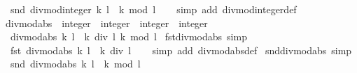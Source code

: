 \begin{isabellebody}
\ \ {\isachardoublequoteopen}snd\ {\isacharparenleft}{\kern0pt}divmod{\isacharunderscore}{\kern0pt}integer\ k\ l{\isacharparenright}{\kern0pt}\ {\isacharequal}{\kern0pt}\ k\ mod\ l{\isachardoublequoteclose}\isanewline
%
\isadelimproof
\ \ %
\endisadelimproof
%
\isatagproof
{}\isamarkupfalse%
\ {\isacharparenleft}{\kern0pt}simp\ add{\isacharcolon}{\kern0pt}\ divmod{\isacharunderscore}{\kern0pt}integer{\isacharunderscore}{\kern0pt}def{\isacharparenright}{\kern0pt}%
\endisatagproof
{\isafoldproof}%
%
\isadelimproof
\isanewline
%
\endisadelimproof
\isanewline
{}\isamarkupfalse%
\ divmod{\isacharunderscore}{\kern0pt}abs\ {\isacharcolon}{\kern0pt}{\isacharcolon}{\kern0pt}\ {\isachardoublequoteopen}integer\ {\isasymRightarrow}\ integer\ {\isasymRightarrow}\ integer\ {\isasymtimes}\ integer{\isachardoublequoteclose}\isanewline
{}\isanewline
\ \ {\isachardoublequoteopen}divmod{\isacharunderscore}{\kern0pt}abs\ k\ l\ {\isacharequal}{\kern0pt}\ {\isacharparenleft}{\kern0pt}{\isasymbar}k{\isasymbar}\ div\ {\isasymbar}l{\isasymbar}{\isacharcomma}{\kern0pt}\ {\isasymbar}k{\isasymbar}\ mod\ {\isasymbar}l{\isasymbar}{\isacharparenright}{\kern0pt}{\isachardoublequoteclose}\isanewline
\isanewline
{}\isamarkupfalse%
\ fst{\isacharunderscore}{\kern0pt}divmod{\isacharunderscore}{\kern0pt}abs\ {\isacharbrackleft}{\kern0pt}simp{\isacharbrackright}{\kern0pt}{\isacharcolon}{\kern0pt}\isanewline
\ \ {\isachardoublequoteopen}fst\ {\isacharparenleft}{\kern0pt}divmod{\isacharunderscore}{\kern0pt}abs\ k\ l{\isacharparenright}{\kern0pt}\ {\isacharequal}{\kern0pt}\ {\isasymbar}k{\isasymbar}\ div\ {\isasymbar}l{\isasymbar}{\isachardoublequoteclose}\isanewline
%
\isadelimproof
\ \ %
\endisadelimproof
%
\isatagproof
{}\isamarkupfalse%
\ {\isacharparenleft}{\kern0pt}simp\ add{\isacharcolon}{\kern0pt}\ divmod{\isacharunderscore}{\kern0pt}abs{\isacharunderscore}{\kern0pt}def{\isacharparenright}{\kern0pt}%
\endisatagproof
{\isafoldproof}%
%
\isadelimproof
\isanewline
%
\endisadelimproof
\isanewline
{}\isamarkupfalse%
\ snd{\isacharunderscore}{\kern0pt}divmod{\isacharunderscore}{\kern0pt}abs\ {\isacharbrackleft}{\kern0pt}simp{\isacharbrackright}{\kern0pt}{\isacharcolon}{\kern0pt}\isanewline
\ \ {\isachardoublequoteopen}snd\ {\isacharparenleft}{\kern0pt}divmod{\isacharunderscore}{\kern0pt}abs\ k\ l{\isacharparenright}{\kern0pt}\ {\isacharequal}{\kern0pt}\ {\isasymbar}k{\isasymbar}\ mod\ {\isasymbar}l{\isasymbar}{\isachardoublequoteclose}\isanewline
%
\isadelimproof
\ \ %
\endisadelimproof
%
\isatagproof

\end{isabellebody}
